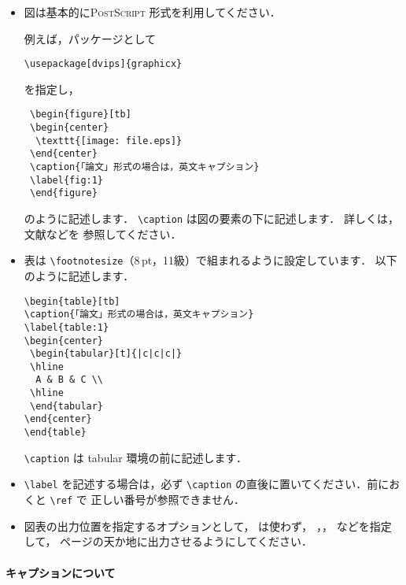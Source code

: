 \documentclass[paper]{jrsj}    %
\def\PS{{\scshape Post\-Script}}
\begin{document}
\begin{itemize}
 \item
 図は基本的に\PS{} 形式を利用してください．

 例えば，パッケージとして
\begin{verbatim}
\usepackage[dvips]{graphicx}
\end{verbatim}
 を指定し，
\begin{verbatim}
 \begin{figure}[tb]
 \begin{center}
  \texttt{[image: file.eps]}
 \end{center}
 \caption{「論文」形式の場合は，英文キャプション}
 \label{fig:1}
 \end{figure}
\end{verbatim}
 のように記述します．
 \verb/\caption/ は図の要素の下に記述します．
 詳しくは，文献\cite{Nakano,Okumura3,Eguchi,Takayama}などを
 参照してください．

 \item
 表は \verb/\footnotesize/（8\,pt，11級）で組まれるように設定しています．
 以下のように記述します．
\begin{verbatim}
\begin{table}[tb]
\caption{「論文」形式の場合は，英文キャプション}
\label{table:1}
\begin{center}
 \begin{tabular}[t]{|c|c|c|}
 \hline
  A & B & C \\
 \hline
 \end{tabular}
\end{center}
\end{table}
\end{verbatim}
 \verb/\caption/ は tabular 環境の前に記述します．

 \item
 \verb/\label/ を記述する場合は，必ず
 \verb/\caption/ の直後に置いてください．前におくと \verb/\ref/ で
 正しい番号が参照できません．

 \item
 図表の出力位置を指定するオプションとして，{\ttfamily [h]} は使わず，
 {\ttfamily [t]}，{\ttfamily [b]}，{\ttfamily [tbp]} などを指定して，
 ページの天か地に出力させるようにしてください．
\end{itemize}

\paragraph{キャプションについて}
\end{document}
